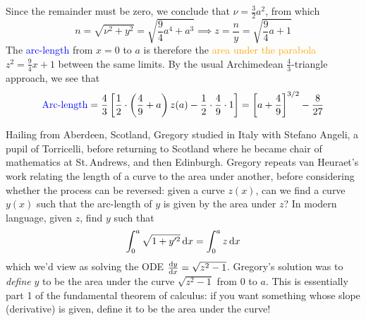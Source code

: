 Since the remainder must be zero, we conclude that $\nu=\frac 32a^2$, from which
\[
	n=\sqrt{\nu^2+y^2}=\sqrt{\frac 94a^4+a^3}\implies z=\frac ny=\sqrt{\frac 94a+1}
\]
The \textcolor{blue}{arc-length} from $x=0$ to $a$ is therefore the \textcolor{orange}{area under the parabola} $z^2=\frac 94x+1$ between the same limits. By the usual Archimedean $\frac 43$-triangle approach, we see that
\[
	\text{\textcolor{blue}{Arc-length}}=\frac 43\left[\frac 12\cdot\left(\frac 49+a\right)z(a)-\frac 12\cdot \frac 49\cdot 1\right] =\left[a+\frac 49\right]^{3/2}-\frac 8{27}
\]

 Hailing from Aberdeen, Scotland, Gregory studied in Italy with Stefano Angeli, a pupil of Torricelli, before returning to Scotland where he became chair of mathematics at St.\,Andrews, and then Edinburgh.\smallbreak
Gregory repeats van Heuraet's work relating the length of a curve to the area under another, before considering whether the process can be reversed: given a curve $z(x)$, can we find a curve $y(x)$ such that the arc-length of $y$ is given by the area under $z$? In modern language, given $z$, find $y$ such that
\[
	\int_0^a\sqrt{1+y'^2}\,\dx=\int_0^az\,\dx
\]
which we'd view as solving the ODE $\diff[y]{x}=\sqrt{z^2-1}$. Gregory's solution was to \emph{define} $y$ to be the area under the curve $\sqrt{z^2-1}$ from $0$ to $a$. This is essentially part 1 of the fundamental theorem of calculus: if you want something whose slope (derivative) is given, define it to be the area under the curve!

\goodbreak

